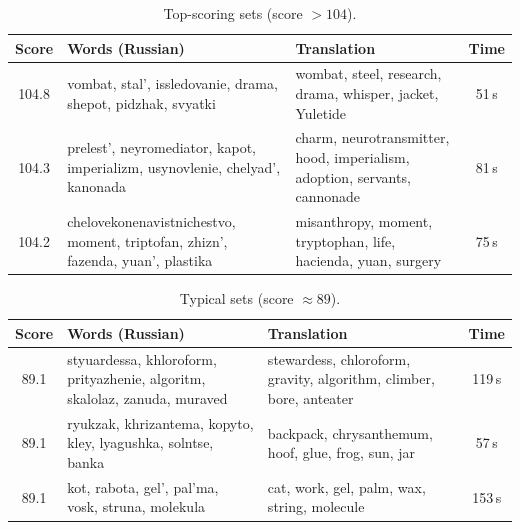 \documentclass[12pt]{article}
\begin{document}
\begin{table}[htbp]
\centering
\caption{Top-scoring sets (score $> 104$).}
\label{tab:examples_top}
\small
\begin{tabular}{@{}clp{7cm}c@{}}
\toprule
Score & Words (Russian) & Translation & Time \\
\midrule
104.8 & \parbox[t]{4cm}{\raggedright vombat, stal', issledovanie, drama, shepot, pidzhak, svyatki} & wombat, steel, research, drama, whisper, jacket, Yuletide & 51\,s \\
104.3 & \parbox[t]{4cm}{\raggedright prelest', neyromediator, kapot, imperializm, usynovlenie, chelyad', kanonada} & charm, neurotransmitter, hood, imperialism, adoption, servants, cannonade & 81\,s \\
104.2 & \parbox[t]{4cm}{\raggedright chelovekonenavist\-nichestvo, moment, triptofan, zhizn', fazenda, yuan', plastika} & misanthropy, moment, tryptophan, life, hacienda, yuan, surgery & 75\,s \\
\bottomrule
\end{tabular}
\end{table}

\begin{table}[htbp]
\centering
\caption{Typical sets (score $\approx 89$).}
\label{tab:examples_typical}
\small
\begin{tabular}{@{}clp{7cm}c@{}}
\toprule
Score & Words (Russian) & Translation & Time \\
\midrule
89.1 & \parbox[t]{4cm}{\raggedright styuardessa, khloroform, prityazhenie, algoritm, skalolaz, zanuda, muraved} & stewardess, chloroform, gravity, algorithm, climber, bore, anteater & 119\,s \\
89.1 & \parbox[t]{4cm}{\raggedright ryukzak, khrizantema, kopyto, kley, lyagushka, solntse, banka} & backpack, chrysanthemum, hoof, glue, frog, sun, jar & 57\,s \\
89.1 & \parbox[t]{4cm}{\raggedright kot, rabota, gel', pal'ma, vosk, struna, molekula} & cat, work, gel, palm, wax, string, molecule & 153\,s \\
\bottomrule
\end{tabular}
\end{table}
\end{document}
